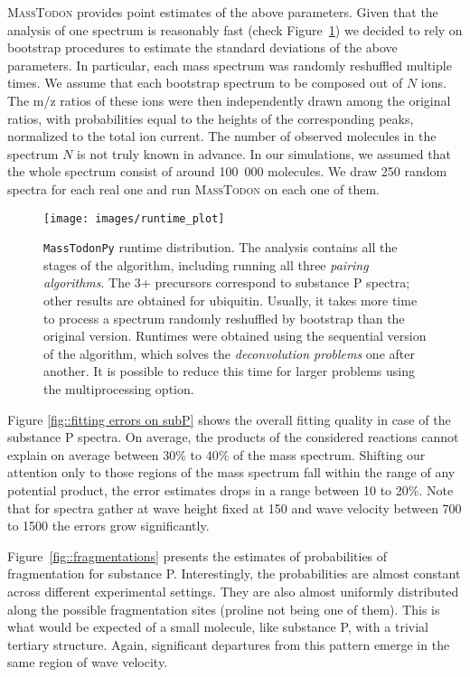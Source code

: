 \documentclass[journal=ancham, manuscript=article, layout=twocolumn]{achemso}
\begin{document}
\textsc{MassTodon} provides point estimates of the above parameters. 
Given that the analysis of one spectrum is reasonably fast (check Figure~\ref{fig::runtime}) we decided to rely on bootstrap procedures\cite{efron1994introduction,wasserman2013all} to estimate the standard deviations of the above parameters.
In particular, each mass spectrum was randomly reshuffled multiple times. 
We assume that each bootstrap spectrum to be composed out of $N$ ions. 
The m/z ratios of these ions were then independently drawn among the original ratios, with  probabilities equal to the heights of the corresponding peaks, normalized to the total ion current. 
The number of observed molecules in the spectrum $N$ is not truly known in advance. 
In our simulations, we assumed that the whole spectrum consist of around 100~000 molecules.  
We draw 250 random spectra for each real one and run \textsc{MassTodon} on each one of them.
\begin{figure}[t]
	\centering
	\texttt{[image: images/runtime\_plot]}
	\caption{{\tt MassTodonPy} runtime distribution. The analysis contains all the stages of the algorithm, including running all three \textit{pairing algorithms}. The 3+ precursors correspond to substance P spectra; other results are obtained for ubiquitin. Usually, it takes more time to process a spectrum randomly reshuffled by bootstrap than the original version. Runtimes were obtained using the sequential version of the algorithm, which solves the \textit{deconvolution problems} one after another. It is possible to reduce this time for larger problems using the multiprocessing option.}
    \label{fig::runtime}
\end{figure}


Figure \ref{fig::fitting errors on subP} shows the overall fitting quality in case of the substance P spectra. On average, the products of the considered reactions cannot explain on average between 30\% to 40\% of the mass spectrum.
Shifting our attention only to those regions of the mass spectrum fall within the range of any potential product, the error estimates drops in a range between 10 to 20\%.   
Note that for spectra gather at wave height fixed at 150 and wave velocity between 700 to 1500 the errors grow significantly. 

Figure~\ref{fig::fragmentations} presents the estimates of probabilities of fragmentation for substance P. Interestingly, the probabilities are almost constant across different experimental settings.
They are also almost uniformly distributed along the possible fragmentation sites (proline not being one of them).
This is what would be expected of a small molecule, like substance P, with a trivial tertiary structure.
Again, significant departures from this pattern emerge in the same region of wave velocity. 
\end{document}
